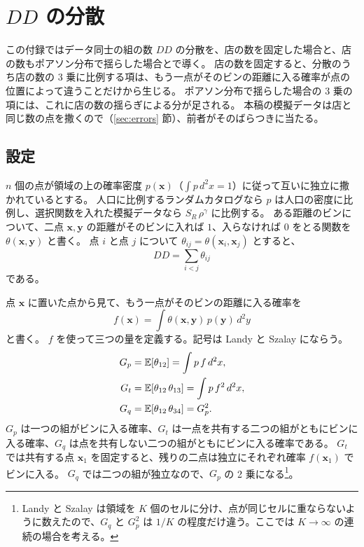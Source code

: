 \documentclass[a4paper,11pt]{ltjsarticle}
\begin{document}
\section{\texorpdfstring{$DD$}{DD} の分散}
\label{app:var-dd}

この付録ではデータ同士の組の数 $DD$ の分散を、店の数を固定した場合と、店の数もポアソン分布で揺らした場合とで導く。
店の数を固定すると、分散のうち店の数の 3 乗に比例する項は、もう一点がそのビンの距離に入る確率が点の位置によって違うことだけから生じる。
ポアソン分布で揺らした場合の 3 乗の項には、これに店の数の揺らぎによる分が足される。
本稿の模擬データは店と同じ数の点を撒くので（\ref{sec:errors} 節）、前者がそのばらつきに当たる。

\subsection{設定}

$n$ 個の点が領域の上の確率密度 $p(\bm{x})$（$\int p\, d^2x = 1$）に従って互いに独立に撒かれているとする。
人口に比例するランダムカタログなら $p$ は人口の密度に比例し、選択関数を入れた模擬データなら $S_R\, \rho^{\gamma}$ に比例する。
ある距離のビンについて、二点 $\bm{x}, \bm{y}$ の距離がそのビンに入れば $1$、入らなければ $0$ をとる関数を $\theta(\bm{x}, \bm{y})$ と書く。
点 $i$ と点 $j$ について $\theta_{ij} = \theta(\bm{x}_i, \bm{x}_j)$ とすると、
\begin{equation}
  DD = \sum_{i<j} \theta_{ij}
  \label{eq:dd-sum}
\end{equation}
である。

点 $\bm{x}$ に置いた点から見て、もう一点がそのビンの距離に入る確率を
\begin{equation}
  f(\bm{x}) = \int \theta(\bm{x}, \bm{y})\, p(\bm{y})\, d^2y
  \label{eq:f-def}
\end{equation}
と書く。
$f$ を使って三つの量を定義する。記号は Landy と Szalay \cite{LandySzalay1993} にならう。
\begin{align}
  G_p &= \mathbb{E}[\theta_{12}] = \int p\, f\, d^2x, \notag \\
  G_t &= \mathbb{E}[\theta_{12}\, \theta_{13}] = \int p\, f^2\, d^2x, \label{eq:g-def} \\
  G_q &= \mathbb{E}[\theta_{12}\, \theta_{34}] = G_p^2. \notag
\end{align}
$G_p$ は一つの組がビンに入る確率、$G_t$ は一点を共有する二つの組がともにビンに入る確率、$G_q$ は点を共有しない二つの組がともにビンに入る確率である。
$G_t$ では共有する点 $\bm{x}_1$ を固定すると、残りの二点は独立にそれぞれ確率 $f(\bm{x}_1)$ でビンに入る。
$G_q$ では二つの組が独立なので、$G_p$ の 2 乗になる\footnote{Landy と Szalay は領域を $K$ 個のセルに分け、点が同じセルに重ならないように数えたので、$G_q$ と $G_p^2$ は $1/K$ の程度だけ違う。ここでは $K \to \infty$ の連続の場合を考える。}。
\end{document}

